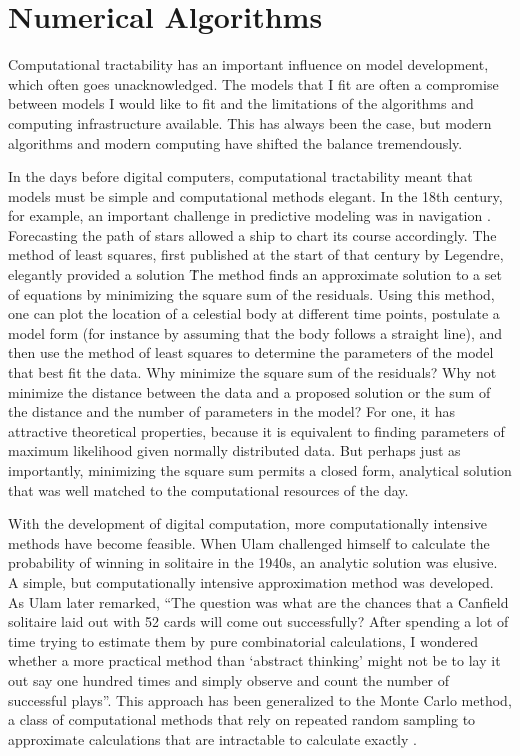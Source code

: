 \chapter{Numerical Algorithms}

Computational tractability has an important influence on model
development, which often goes unacknowledged. The models that I fit
are often a compromise between models I would like to fit and the
limitations of the algorithms and computing infrastructure
available. This has always been the case, but modern algorithms and
modern computing have shifted the balance tremendously.

In the days before digital computers, computational tractability meant
that models must be simple and computational methods elegant. In the
18th century, for example, an important challenge in predictive
modeling was in navigation \cite{Williams_From_1993}. Forecasting the
path of stars allowed a ship to chart its course accordingly. The
method of least squares, first published at the start of that century
by Legendre, elegantly provided a solution
\cite{Legendre_Nouvelles_2011}\. The method finds an approximate
solution to a set of equations by minimizing the square sum of the
residuals. Using this method, one can plot the location of a celestial
body at different time points, postulate a model form (for instance by
assuming that the body follows a straight line), and then use the
method of least squares to determine the parameters of the model that
best fit the data. Why minimize the square sum of the residuals? Why
not minimize the distance between the data and a proposed solution or
the sum of the distance and the number of parameters in the model? For
one, it has attractive theoretical properties, because it is
equivalent to finding parameters of maximum likelihood given normally
distributed data. But perhaps just as importantly, minimizing the
square sum permits a closed form, analytical solution that was well
matched to the computational resources of the day.

With the development of digital computation, more computationally
intensive methods have become feasible. When Ulam challenged himself
to calculate the probability of winning in solitaire in the 1940s, an
analytic solution was elusive. A simple, but computationally intensive
approximation method was developed. As Ulam later remarked, ``The
question was what are the chances that a Canfield solitaire laid out
with 52 cards will come out successfully? After spending a lot of time
trying to estimate them by pure combinatorial calculations, I wondered
whether a more practical method than `abstract thinking' might not
be to lay it out say one hundred times and simply observe and count
the number of successful plays''. This approach has been
generalized to the Monte Carlo method, a class of computational
methods that rely on repeated random sampling to approximate
calculations that are intractable to calculate exactly
\cite{Eckhardt_Stan_1987}.

